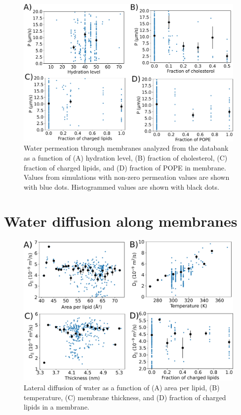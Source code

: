 \documentclass[fleqn,10pt]{wlscirep}
\begin{document}
\begin{figure}[!h]
    \centering
    \includegraphics[width = 180mm]{Figures/permeationSI.pdf}
    \caption{Water permeation through membranes analyzed from the databank as a function of (A) hydration level, (B) fraction of cholesterol, (C) fraction of charged lipids, and (D) fraction of POPE in membrane. Values from simulations with non-zero permeation values are shown with blue dots. Histogrammed values are shown with black dots.
    }
    \label{fig:permeationSI}
\end{figure}

\pagebreak
\section{Water diffusion along membranes}

\begin{figure}[!h]
    \centering
    \includegraphics[width = 180mm]{Figures/LateralDiffusionSI.pdf}
    \caption{Lateral diffusion of water as a function of (A) area per lipid, (B) temperature, (C) membrane thickness, and (D) fraction of charged lipids in a membrane.}
    \label{fig:diffusionSI}
\end{figure}
\end{document}
